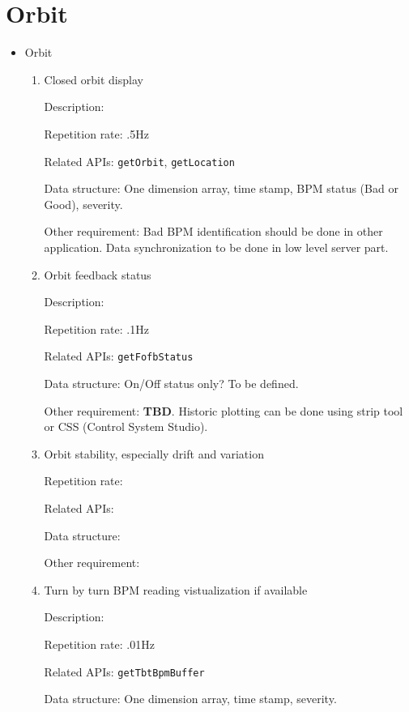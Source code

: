 \documentclass[letterpaper,showtrims]{memoir}
\newcommand{\code}[1]{\texttt{#1}}
\newcommand{\strong}[1]{{\bfseries #1}}
\begin{document}
\section{Orbit}

\begin{itemize}
    \item Orbit
    \begin{enumerate}
    \item Closed orbit display

        Description: 
        
        Repetition rate: .5Hz
        
        Related APIs: \code{getOrbit}, \code{getLocation}
        
        Data structure: One dimension array, time stamp, BPM status
        (Bad or Good), severity.

        Other requirement: Bad BPM identification should be done in
        other application. Data synchronization to be done in low
        level server part.

    \item Orbit feedback status

        Description: 
        
        Repetition rate: .1Hz
        
        Related APIs: \code{getFofbStatus}
        
        Data structure: On/Off status only? To be defined.

        Other requirement: \strong{TBD}. Historic plotting can be done using
        strip tool or CSS (Control System Studio).

    \item Orbit stability, especially drift and variation

        Repetition rate: 
        
        Related APIs: 
        
        Data structure:

        Other requirement:

    \item Turn by turn BPM reading vistualization if available

        Description: 
        
        Repetition rate: .01Hz
        
        Related APIs: \code{getTbtBpmBuffer}
        
        Data structure: One dimension array, time stamp, severity.


\end{enumerate}
\end{itemize}
\end{document}
